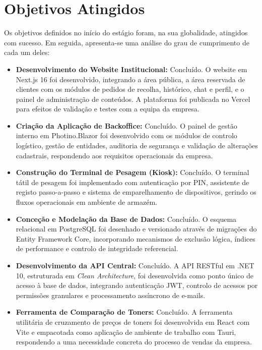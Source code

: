\section{Objetivos Atingidos}

Os objetivos definidos no início do estágio foram, na sua globalidade, atingidos com sucesso. Em seguida, apresenta-se uma análise do grau de cumprimento de cada um deles:

\begin{itemize}
    \item \textbf{Desenvolvimento do Website Institucional:} Concluído. O website em Next.js 16 foi desenvolvido, integrando a área pública, a área reservada de clientes com os módulos de pedidos de recolha, histórico, chat e perfil, e o painel de administração de conteúdos. A plataforma foi publicada no Vercel para efeitos de validação e testes com a equipa da empresa.
 
    \item \textbf{Criação da Aplicação de Backoffice:} Concluído. O painel de gestão interno em Photino.Blazor foi desenvolvido com os módulos de controlo logístico, gestão de entidades, auditoria de segurança e validação de alterações cadastrais, respondendo aos requisitos operacionais da empresa.

    \item \textbf{Construção do Terminal de Pesagem (Kiosk):} Concluído. O terminal tátil de pesagem foi implementado com autenticação por PIN, assistente de registo passo-a-passo e sistema de emparelhamento de dispositivos, gerindo os fluxos operacionais em ambiente de armazém.

    \item \textbf{Conceção e Modelação da Base de Dados:} Concluído. O esquema relacional em PostgreSQL foi desenhado e versionado através de migrações do Entity Framework Core, incorporando mecanismos de exclusão lógica, índices de performance e controlo de integridade referencial.

    \item \textbf{Desenvolvimento da API Central:} Concluído. A API RESTful em .NET 10, estruturada em \textit{Clean Architecture}, foi desenvolvida como ponto único de acesso à base de dados, integrando autenticação JWT, controlo de acessos por permissões granulares e processamento assíncrono de e-mails.

    \item \textbf{Ferramenta de Comparação de Toners:} Concluído. A ferramenta utilitária de cruzamento de preços de toners foi desenvolvida em React com Vite e empacotada como aplicação de ambiente de trabalho com Tauri, respondendo a uma necessidade concreta do processo de vendas da empresa.


\end{itemize}
